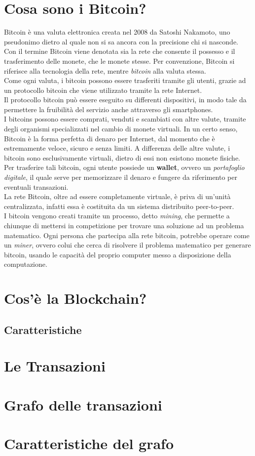 \section{Cosa sono i Bitcoin?}

Bitcoin è una valuta elettronica creata nel 2008 da Satoshi Nakamoto, uno pseudonimo dietro al quale non si sa ancora con la precisione chi si nasconde.
Con il termine Bitcoin viene denotata sia la rete che consente il possesso e il trasferimento delle monete, che le monete stesse. Per convenzione, Bitcoin si riferisce alla tecnologia della rete, mentre \textit{bitcoin} alla valuta stessa.\\
Come ogni valuta, i bitcoin possono essere trasferiti tramite gli utenti, grazie ad un protocollo bitcoin che viene utilizzato tramite la rete Internet. \\ Il protocollo bitcoin può essere eseguito su differenti dispositivi, in modo tale da permettere la fruibilità del servizio anche attraverso gli smartphones.\\
I bitcoins possono essere comprati, venduti e scambiati con altre valute, tramite degli organismi specializzati nel cambio di monete virtuali. In un certo senso, Bitcoin è la forma perfetta di denaro per Internet, dal momento che è estremamente veloce, sicuro e senza limiti.
A differenza delle altre valute, i bitcoin sono esclusivamente virtuali, dietro di essi non esistono monete fisiche.\\ Per trasferire tali bitcoin, ogni utente possiede un \textbf{wallet}, ovvero un \textit{portafoglio digitale}, il quale serve per memorizzare il denaro e fungere da riferimento per eventuali transazioni.\\
La rete Bitcoin, oltre ad essere completamente virtuale, è priva di un'unità centralizzata, infatti essa è costituita da un sistema distribuito peer-to-peer.\\
I bitcoin vengono creati tramite un processo, detto \textit{mining}, che permette a chiunque di mettersi in competizione per trovare una soluzione ad un problema matematico. Ogni persona che partecipa alla rete bitcoin, potrebbe operare come un \textit{miner}, ovvero colui che cerca di risolvere il problema matematico per generare bitcoin, usando le capacità del proprio computer messo a disposizione della computazione.

\section{Cos'è la Blockchain?}
\subsection{Caratteristiche}
\section{Le Transazioni}
\section{Grafo delle transazioni}
\section{Caratteristiche del grafo}
